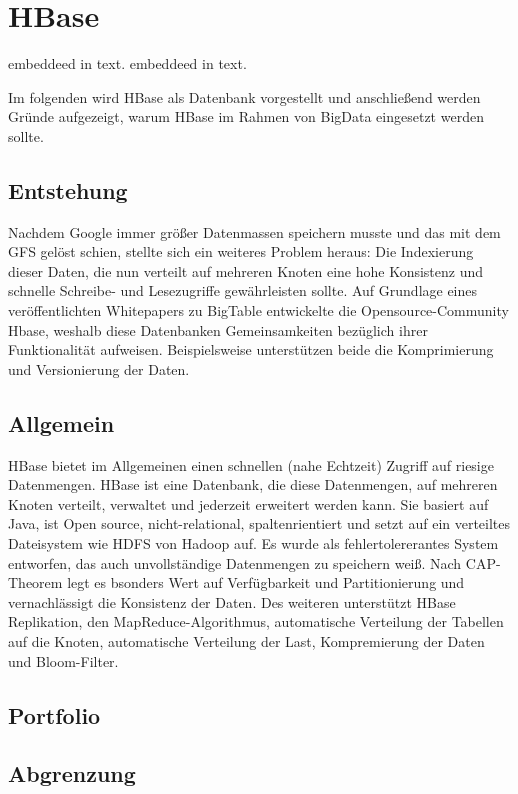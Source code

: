 \section{HBase}

\cite{Redt01} embeddeed in text.
\cite{SpaOd16} embeddeed in text.


Im folgenden wird HBase als Datenbank vorgestellt und anschließend werden Gründe aufgezeigt, warum HBase im Rahmen von BigData eingesetzt werden sollte.

\subsection{Entstehung}
Nachdem Google immer größer Datenmassen speichern musste und das mit dem GFS gelöst schien, stellte sich ein weiteres Problem heraus: Die Indexierung dieser Daten, die nun verteilt auf mehreren Knoten eine hohe Konsistenz und schnelle Schreibe- und Lesezugriffe gewährleisten sollte. Auf Grundlage eines veröffentlichten Whitepapers zu BigTable entwickelte die Opensource-Community Hbase, weshalb diese Datenbanken Gemeinsamkeiten bezüglich ihrer Funktionalität aufweisen. Beispielsweise unterstützen beide die Komprimierung und Versionierung der Daten.

\subsection{Allgemein}
HBase bietet im Allgemeinen einen schnellen (nahe Echtzeit) Zugriff auf riesige Datenmengen. HBase ist eine Datenbank, die diese Datenmengen, auf mehreren Knoten verteilt, verwaltet und jederzeit erweitert werden kann. Sie basiert auf Java, ist Open source, nicht-relational, spaltenrientiert und setzt auf ein verteiltes Dateisystem wie HDFS von Hadoop auf. Es wurde als fehlertolererantes System entworfen, das auch unvollständige Datenmengen zu speichern weiß. Nach CAP-Theorem legt es bsonders Wert auf Verfügbarkeit und Partitionierung und vernachlässigt die Konsistenz der Daten. Des weiteren unterstützt HBase Replikation, den MapReduce-Algorithmus, automatische Verteilung der Tabellen auf die Knoten, automatische Verteilung der Last, Kompremierung der Daten und Bloom-Filter. 

\subsection{Portfolio}

\subsection{Abgrenzung}
